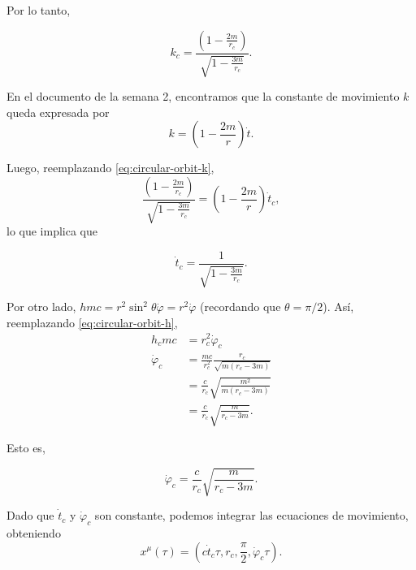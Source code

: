 \documentclass[letterpaper,11pt]{article}
\begin{document}
Por lo tanto,
\begin{shaded}
\begin{equation} \label{eq:circular-orbit-k}
k_c = \frac{\left( 1 - \frac{2m}{r_c}\right)}{\sqrt{ 1 - \frac{3m}{r_c}}}.
\end{equation}
\end{shaded}

En el documento de la semana 2, encontramos que la constante de movimiento $k$ queda expresada por
\begin{equation}
k = \left( 1 -  \frac{2m}{r}\right) \dot{t}.
\end{equation}

Luego, reemplazando \eqref{eq:circular-orbit-k}, 
\begin{equation}
\frac{\left( 1 - \frac{2m}{r_c}\right)}{\sqrt{ 1 - \frac{3m}{r_c}}} =  \left( 1 -  \frac{2m}{r}\right) \dot{t}_c,
\end{equation}
lo que implica que
\begin{shaded}
\begin{equation} \label{eq:circular-orbit-t}
\dot{t}_c = \frac{1}{\sqrt{1 - \frac{3m}{r_c}}}.
\end{equation}
\end{shaded}

Por otro lado, $hmc = r^2 \sin^2\theta \dot{\varphi} = r^2 \dot{\varphi}$ (recordando que $\theta = \pi/2$). Así, reemplazando \eqref{eq:circular-orbit-h},
\begin{align}
h_c m c &= r_c^2 \dot{\varphi}_c \\
\dot{\varphi}_c &= \frac{mc}{r_c^2} \frac{r_c}{\sqrt{m(r_c - 3m)}} \\
&= \frac{c}{r_c} \sqrt{\frac{m^2}{m(r_c - 3m)}} \\
&= \frac{c}{r_c} \sqrt{\frac{m}{r_c-3m}}.
\end{align}

Esto es,
\begin{shaded}
\begin{equation} \label{eq:circular-orbit-phi}
\dot{\varphi}_c = \frac{c}{r_c} \sqrt{\frac{m}{r_c-3m}}.
\end{equation}
\end{shaded}

Dado que $\dot{t}_c$ y $\dot{\varphi}_c$ son constante, podemos integrar las ecuaciones de movimiento, obteniendo
\begin{equation}
x^{\mu}(\tau) = \left( c\dot{t}_c \tau, r_c, \frac{\pi}{2},\dot{\varphi}_c \tau \right).
\end{equation}
\end{document}
